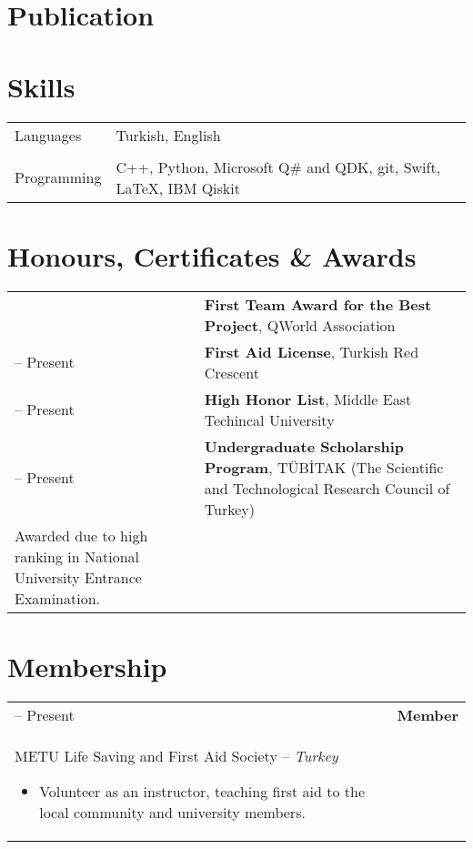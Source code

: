 \documentclass[11pt]{article} %
\makeatletter
\newlength{\firstColumnWidth}
\newlength{\tabusep}
\newcommand{\twoNewline}{\tabularnewline & \tabularnewline}
\newenvironment{twocols}
    {
    \begin{longtable}[h]{%
        @{}%
        >{\raggedleft}p{\firstColumnWidth}%
        @{\hspace{\tabusep}}%
        >{\arraybackslash\raggedright}p{\dimexpr %
            \linewidth-\firstColumnWidth-\tabusep%
        \relax}%
        @{}%
        }
    } {
        \end{longtable}
    }
\makeatother
\begin{document}
\section{Publication}


\section{Skills}

\begin{twocols}
    Languages & Turkish, English \twoNewline
    Programming & C++, Python, Microsoft Q\# and QDK, git, Swift, \LaTeX, IBM Qiskit
\end{twocols}

\section{Honours, Certificates \& Awards}
\vspace{-.5em}
\renewcommand*{\arraystretch}{1.5}

\begin{twocols}
    2020 & \textbf{First Team Award for the Best Project}, QWorld Association \tabularnewline
    2018 -- Present & \textbf{First Aid License}, Turkish Red Crescent \tabularnewline
    2017 -- Present & \textbf{High Honor List}, Middle East Techincal University \tabularnewline
    2017 -- Present & %
        \textbf{Undergraduate Scholarship Program}, TÜBİTAK (The Scientific and Technological Research Council of Turkey)\\
        Awarded due to high ranking in National University Entrance Examination.
\end{twocols}

\section{Membership}
\begin{twocols}
    2018 -- Present & %
    \textbf{Member} \\ 
    METU Life Saving and First Aid Society -- \textit{Turkey}
    \begin{itemize}
        \item Volunteer as an instructor, teaching first aid to the local community and university members.
    \end{itemize}
\end{twocols}
\end{document}
